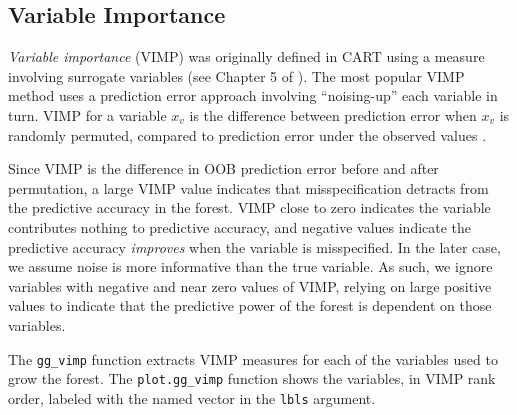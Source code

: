 \documentclass[article, nojss]{jss}
\begin{document}
\subsection{Variable Importance}\label{variable-importance}

\emph{Variable importance} (VIMP) was originally defined in CART using a
measure involving surrogate variables (see Chapter 5 of
\citep{cart:1984}). The most popular VIMP method uses a prediction error
approach involving ``noising-up'' each variable in turn. VIMP for a
variable \(x_v\) is the difference between prediction error when \(x_v\)
is randomly permuted, compared to prediction error under the observed
values \citep{Breiman:2001, Liaw:2002, Ishwaran:2007, Ishwaran:2008}.

Since VIMP is the difference in OOB prediction error before and after
permutation, a large VIMP value indicates that misspecification detracts
from the predictive accuracy in the forest. VIMP close to zero indicates
the variable contributes nothing to predictive accuracy, and negative
values indicate the predictive accuracy \emph{improves} when the
variable is misspecified. In the later case, we assume noise is more
informative than the true variable. As such, we ignore variables with
negative and near zero values of VIMP, relying on large positive values
to indicate that the predictive power of the forest is dependent on
those variables.

The \texttt{gg\_vimp} function extracts VIMP measures for each of the
variables used to grow the forest. The \texttt{plot.gg\_vimp} function
shows the variables, in VIMP rank order, labeled with the named vector
in the \texttt{lbls} argument.
\end{document}
